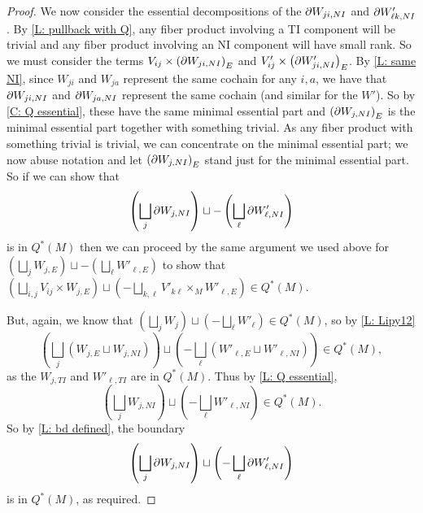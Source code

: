 \begin{proof}
	We now consider the essential decompositions of the $\partial W_{ji,NI}$ and $\partial W'_{\ell k,NI}$.
	By \cref{L: pullback with Q}, any fiber product involving a TI component will be trivial and any fiber product involving an NI component will have small rank.
	So we must consider the terms $V_{ij} \times \left(\partial W_{ji,NI}\right)_E$ and $V'_{ij} \times \left(\partial W'_{ji,NI}\right)_E$.
	By \cref{L: same NI}, since $W_{ji}$ and $W_{ja}$ represent the same cochain for any $i,a$, we have that $\partial W_{ji,NI}$ and $\partial W_{ja,NI}$ represent the same cochain (and similar for the $W'$).
	So by \cref{C: Q essential}, these have the same minimal essential part and $\left(\partial W_{j,NI}\right)_E$ is the minimal essential part together with something trivial.
	As any fiber product with something trivial is trivial, we can concentrate on the minimal essential part; we now abuse notation and let $\left(\partial W_{j,NI}\right)_E$ stand just for the minimal essential part.
	So if we can show that
	$$\left(\bigsqcup_j \partial W_{j,NI}\right) \sqcup -\left(\bigsqcup_\ell \partial W'_{\ell,NI}\right)$$
	is in $Q^*(M)$ then we can proceed by the same argument we used above for $\left(\bigsqcup_j W_{j,E}\right) \sqcup -\left(\bigsqcup_\ell W'_{\ell,E}\right)$ to show that $\left(\bigsqcup_{i,j} V_{ij} \times W_{j,E}\right) \sqcup \left(-\bigsqcup_{k,\ell} V'_{k\ell} \times_M W'_{\ell,E}\right) \in Q^*(M)$.

	But, again, we know that
	$\left(\bigsqcup_j W_{j}\right) \sqcup \left(-\bigsqcup_\ell W'_{\ell}\right) \in Q^*(M)$, so by \cref{L: Lipy12}
	$$\left(\bigsqcup_j \left(W_{j,E} \sqcup W_{j,NI}\right)\right) \sqcup \left(-\bigsqcup_\ell \left(W'_{\ell,E} \sqcup W'_{\ell,NI}\right)\right) \in Q^*(M),$$
	as the $W_{j,TI}$ and $W'_{\ell, TI}$ are in $Q^*(M)$.
	Thus by \cref{L: Q essential}, $$\left(\bigsqcup_j W_{j,NI}\right) \sqcup \left(-\bigsqcup_\ell W'_{\ell,NI}\right) \in Q^*(M).$$
	So by \cref{L: bd defined}, the boundary
	$$\left(\bigsqcup_j \partial W_{j,NI}\right) \sqcup \left(-\bigsqcup_\ell \partial W'_{\ell,NI}\right)$$ is in $Q^*(M)$, as required.
\end{proof}



\begin{comment}
	\begin{corollary}
		Let $M$ be a manifold without boundary.
		Suppose $\underline{V_1}, \underline{V_2} \in C_\Gamma^*(M)$ are both simply transverse to $\uW \in C_\Gamma^*(M)$.
		Then $\underline{V_1 + V_2}$ is compound transverse to $\uW$ and $$\underline{V_1 + V_2} \uplus \uW = \underline{V_1} \uplus \uW + \underline{V_2} \uplus \uW.$$
		The equivalent statements hold for the cap and intersection products and with the sum in the second variable.
	\end{corollary}
	\begin{proof}
	This follows immediately from the definitions and \cref{D: cochain products,D: multicup,T: multicup}, taking in the theorem statement $\uV = \underline{V_1} + \underline{V_2}$ and letting $\uW$ simply be itself without splitting it into a sum.
	\end{proof}
\end{comment}

